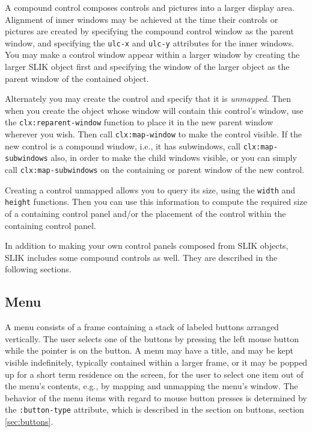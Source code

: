 \documentclass[twoside,openright,11pt]{report}
\newcommand{\tp}[1]{\texttt{#1}}
\begin{document}
A compound control composes controls and pictures into a larger
display area.  Alignment of inner windows may be achieved at the time
their controls or pictures are created by specifying the compound
control window as the parent window, and specifying the \tp{ulc-x}
and \tp{ulc-y} attributes for the inner windows.  You may make a
control window appear within a larger window by creating the larger
SLIK object first and specifying the window of the larger object as
the parent window of the contained object.

Alternately you may create the control and specify that it is
\emph{unmapped}.  Then when you create the object whose window will
contain this control's window, use the \tp{clx:reparent-window}
function to place it in the new parent window wherever you wish.  Then
call \tp{clx:map-window} to make the control visible.  If the new
control is a compound window, i.e., it has subwindows, call
\tp{clx:map-subwindows} also, in order to make the child windows
visible, or you can simply call \tp{clx:map-subwindows} on the
containing or parent window of the new control.

Creating a control unmapped allows you to query its size, using the
\tp{width} and \tp{height} functions.  Then you can use this
information to compute the required size of a containing control panel
and/or the placement of the control within the containing control
panel.

In addition to making your own control panels composed from SLIK
objects, SLIK includes some compound controls as well.  They are
described in the following sections.

\subsection{Menu}

A menu consists of a frame containing a stack of labeled
buttons arranged vertically.  The user selects one of the buttons by
pressing the left mouse button while the pointer is on the button.  A
menu may have a title, and may be kept visible indefinitely, typically
contained within a larger frame, or it may be popped up for a short
term residence on the screen, for the user to select one item out of
the menu's contents, e.g., by mapping and unmapping the menu's window.
The behavior of the menu items with regard to mouse button presses is
determined by the \tp{:button-type} attribute, which is described
in the section on buttons, section \ref{sec:buttons}.
\end{document}
